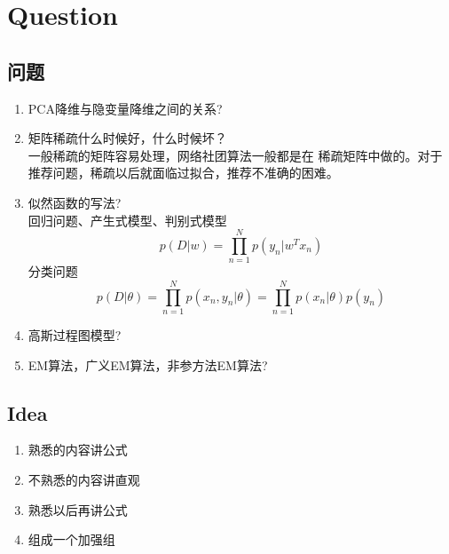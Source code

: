 \chapter{Question}
\section{问题}

\begin{enumerate}
\item PCA降维与隐变量降维之间的关系?\\
\item 矩阵稀疏什么时候好，什么时候坏？\\
一般稀疏的矩阵容易处理，网络社团算法一般都是在
稀疏矩阵中做的。对于推荐问题，稀疏以后就面临过拟合，推荐不准确的困难。
\item 似然函数的写法?\\
回归问题、产生式模型、判别式模型
\begin{equation}
p(D|w) = \prod^N_{n=1} p(y_n|w^Tx_n)
\end{equation}
分类问题
\begin{equation}
p(D|\theta) = \prod_{n=1}^N p(x_n, y_n|\theta)
= \prod_{n=1}^Np(x_n|\theta)p(y_n)
\end{equation}
\item 高斯过程图模型?\\
\item EM算法，广义EM算法，非参方法EM算法?\\
\end{enumerate}

\section{Idea}

\begin{enumerate}
\item 熟悉的内容讲公式
\item 不熟悉的内容讲直观
\item 熟悉以后再讲公式
\item 组成一个加强组 
\end{enumerate}


